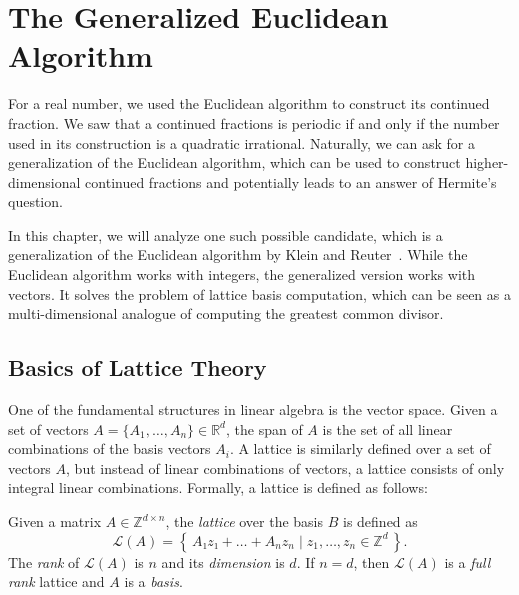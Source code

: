\chapter{The Generalized Euclidean Algorithm}

For a real number, we used the Euclidean algorithm to construct its continued
fraction.
We saw that a continued fractions is periodic if and only if the number used in
its construction is a quadratic irrational.
Naturally, we can ask for a generalization of the Euclidean algorithm,
which can be used to construct higher-dimensional continued fractions
and potentially leads to an answer of Hermite's question.

In this chapter, we will analyze one such possible candidate,
which is a generalization of the Euclidean algorithm by Klein and Reuter~\cite{Klein24}.
While the Euclidean algorithm works with integers,
the generalized version works with vectors.
It solves the problem of lattice basis computation,
which can be seen as a multi-dimensional analogue of computing the greatest
common divisor.

\section{Basics of Lattice Theory}

One of the fundamental structures in linear algebra is the vector space.
Given a set of vectors $A = \{A_1, …, A_n\} ∈ ℝ^d$, the span of $A$ is the set
of all linear combinations of the basis vectors $A_i$.
A lattice is similarly defined over a set of vectors $A$, but instead of linear
combinations of vectors, a lattice consists of only integral linear
combinations.
Formally, a lattice is defined as follows:

\begin{definition}
  Given a matrix $A ∈ ℤ^{d × n}$, the \emph{lattice} over the basis $B$ is defined as
  \[
    \mathcal{L}(A) = \left\{\, A₁z₁ + \dots + A_n z_n \mid z_1, \dots, z_n ∈ ℤ^d \,\right\}.
  \]
  The \emph{rank} of $\mathcal{L}(A)$ is $n$ and its \emph{dimension} is $d$.
  If $n = d$, then $\mathcal{L}(A)$ is a \emph{full rank} lattice and $A$ is a \emph{basis}.
\end{definition}

